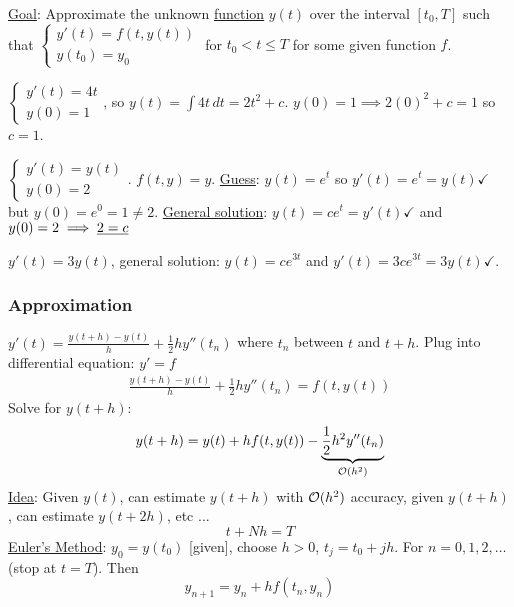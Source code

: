 \documentclass[]{article}
\begin{document}
\ul{Goal}: Approximate the unknown \ul{function} $y(t)$ over the interval $[t_0,T]$ such that $\begin{cases} y'(t) = f(t,y(t)) \\ y(t_0) = y_0 \end{cases}$ for $t_0 < t\leq T$ for some given function $f$.
\begin{example}
$\begin{cases} y'(t) = 4t \\ y(0)=1 \end{cases}$, so $y(t) = \int 4t\,dt = 2t^2+c$. $y(0)=1\implies 2(0)^2+c=1$ so $c=1$. 
\end{example}
\begin{example}
	$\begin{cases} y'(t) = y(t) \\ y(0)=2 \end{cases}$. $f(t,y)=y$.
	\ul{Guess}: $y(t)=e^t$ so $y'(t)=e^t=y(t) \checkmark$ but $y(0)=e^0 = 1\neq 2$.
	\ul{General solution}: $y(t) = ce^t = y'(t) \checkmark$ and $y(0)=2\implies \ul{2=c}$ 
\end{example}
\begin{example}
	$y'(t) = 3y(t)$, general solution: $y(t) = ce^{3t}$ and $y'(t)=3ce^{3t} = 3y(t)\checkmark$.
\end{example}

\subsubsection*{Approximation} $y'(t) = \frac{y(t+h)-y(t)}h + \frac12hy''(t_n)$ where $t_n$ between $t$ and $t+h$.
Plug into differential equation: $y'=f$
\begin{align*}
	\frac{y(t+h)-y(t)}h + \frac12hy''(t_n) = f(t,y(t))
\end{align*}
Solve for $y(t+h)$:
$$ y(t+h) = y(t) + hf(t,y(t)) - \ub{\mc O(h^2)}{\frac12h^2y''(t_n)}$$
\ul{Idea}: Given $y(t)$, can estimate $y(t+h)$ with $\mc O(h^2)$ accuracy,
given $y(t+h)$, can estimate $y(t+2h)$, etc ... $$t+Nh=T$$
\ul{Euler's Method}: $y_0 = y(t_0)$ [given], choose $h>0$, $t_j=t_0+jh$. For $n=0,1,2,\dots$ (stop at $t=T$). Then $$y_{n+1} = y_n+hf(t_n,y_n)$$
\end{document}
